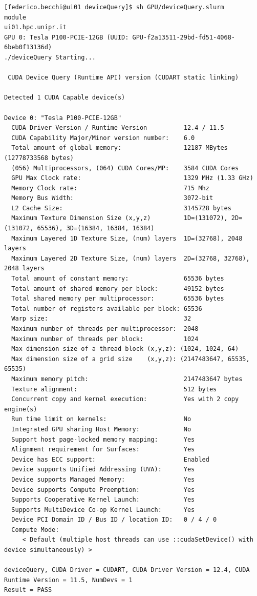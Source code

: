 \documentclass[11pt,a4paper]{article}
\begin{document}
\begin{lstlisting}
[federico.becchi@ui01 deviceQuery]$ sh GPU/deviceQuery.slurm
module
ui01.hpc.unipr.it
GPU 0: Tesla P100-PCIE-12GB (UUID: GPU-f2a13511-29bd-fd51-4068-6beb0f13136d)
./deviceQuery Starting...

 CUDA Device Query (Runtime API) version (CUDART static linking)

Detected 1 CUDA Capable device(s)

Device 0: "Tesla P100-PCIE-12GB"
  CUDA Driver Version / Runtime Version          12.4 / 11.5
  CUDA Capability Major/Minor version number:    6.0
  Total amount of global memory:                 12187 MBytes (12778733568 bytes)
  (056) Multiprocessors, (064) CUDA Cores/MP:    3584 CUDA Cores
  GPU Max Clock rate:                            1329 MHz (1.33 GHz)
  Memory Clock rate:                             715 Mhz
  Memory Bus Width:                              3072-bit
  L2 Cache Size:                                 3145728 bytes
  Maximum Texture Dimension Size (x,y,z)         1D=(131072), 2D=(131072, 65536), 3D=(16384, 16384, 16384)
  Maximum Layered 1D Texture Size, (num) layers  1D=(32768), 2048 layers
  Maximum Layered 2D Texture Size, (num) layers  2D=(32768, 32768), 2048 layers
  Total amount of constant memory:               65536 bytes
  Total amount of shared memory per block:       49152 bytes
  Total shared memory per multiprocessor:        65536 bytes
  Total number of registers available per block: 65536
  Warp size:                                     32
  Maximum number of threads per multiprocessor:  2048
  Maximum number of threads per block:           1024
  Max dimension size of a thread block (x,y,z): (1024, 1024, 64)
  Max dimension size of a grid size    (x,y,z): (2147483647, 65535, 65535)
  Maximum memory pitch:                          2147483647 bytes
  Texture alignment:                             512 bytes
  Concurrent copy and kernel execution:          Yes with 2 copy engine(s)
  Run time limit on kernels:                     No
  Integrated GPU sharing Host Memory:            No
  Support host page-locked memory mapping:       Yes
  Alignment requirement for Surfaces:            Yes
  Device has ECC support:                        Enabled
  Device supports Unified Addressing (UVA):      Yes
  Device supports Managed Memory:                Yes
  Device supports Compute Preemption:            Yes
  Supports Cooperative Kernel Launch:            Yes
  Supports MultiDevice Co-op Kernel Launch:      Yes
  Device PCI Domain ID / Bus ID / location ID:   0 / 4 / 0
  Compute Mode:
     < Default (multiple host threads can use ::cudaSetDevice() with device simultaneously) >

deviceQuery, CUDA Driver = CUDART, CUDA Driver Version = 12.4, CUDA Runtime Version = 11.5, NumDevs = 1
Result = PASS
\end{lstlisting}
\end{document}
